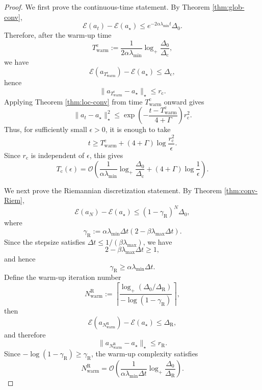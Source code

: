 \documentclass[11pt]{article}
\theoremstyle{plain}
\theoremstyle{definition}
\theoremstyle{remark}
\begin{document}
\begin{proof}
    We first prove the continuous-time statement. By Theorem \ref{thm:glob-conv},
    \[
        \mathcal E(a_t)-\mathcal E(a_\star)
        \leq
        e^{-2\alpha\lambda_{\min}t}
        \Delta_0.
    \]
    Therefore, after the warm-up time
    \[
        T_\mathrm{warm}^\mathrm{c}
        :=
        \frac{1}{2\alpha\lambda_{\min}}
        \log_+
        \frac{\Delta_0}{\Delta_\mathrm{c}},
    \]
    we have
    \[
        \mathcal E(a_{T_\mathrm{warm}^\mathrm{c}})
        -
        \mathcal E(a_\star)
        \leq
        \Delta_\mathrm{c},
    \]
    hence
    \[
        \|a_{T_\mathrm{warm}^\mathrm{c}}-a_\star\|_\star
        \leq
        r_\mathrm{c}.
    \]
    Applying Theorem \ref{thm:loc-conv} from time $T_\mathrm{warm}^\mathrm{c}$ onward gives
    \[
        \|a_t-a_\star\|_\star^2
        \leq
        \exp\left(
            -\frac{t-T_\mathrm{warm}^\mathrm{c}}{4+\Gamma}
        \right)
        r_\mathrm{c}^2.
    \]
    Thus, for sufficiently small $\epsilon>0$, it is enough to take
    \[
        t
        \geq
        T_\mathrm{warm}^\mathrm{c}
        +
        (4+\Gamma)\log\frac{r_\mathrm{c}^2}{\epsilon}.
    \]
    Since $r_\mathrm{c}$ is independent of $\epsilon$, this gives
    \[
        T_\mathrm{c}(\epsilon)
        =
        \mathcal O\left(
            \frac{1}{\alpha\lambda_{\min}}
            \log_+
            \frac{\Delta_0}{\Delta_\mathrm{c}}
            +
            (4+\Gamma)\log\frac{1}{\epsilon}
        \right).
    \]

    We next prove the Riemannian discretization statement. By Theorem \ref{thm:conv-Riem},
    \[
        \mathcal E(a_N)-\mathcal E(a_\star)
        \leq
        (1-\gamma_\mathrm{R})^N
        \Delta_0,
    \]
    where
    \[
        \gamma_\mathrm{R}
        :=
        \alpha\lambda_{\min}\Delta t
        (2-\beta\lambda_{\max}\Delta t).
    \]
    Since the stepsize satisfies $\Delta t\leq 1/(\beta\lambda_{\max})$, we have
    \[
        2-\beta\lambda_{\max}\Delta t \geq 1,
    \]
    and hence
    \[
        \gamma_\mathrm{R}
        \geq
        \alpha\lambda_{\min}\Delta t.
    \]
    Define the warm-up iteration number
    \[
        N_\mathrm{warm}^\mathrm{R}
        :=
        \left\lceil
            \frac{
                \log_+(\Delta_0/\Delta_\mathrm{R})
            }{
                -\log(1-\gamma_\mathrm{R})
            }
        \right\rceil,
    \]
    then
    \[
        \mathcal E(a_{N_\mathrm{warm}^\mathrm{R}})
        -
        \mathcal E(a_\star)
        \leq
        \Delta_\mathrm{R},
    \]
    and therefore
    \[
        \|a_{N_\mathrm{warm}^\mathrm{R}}-a_\star\|_\star
        \leq
        r_\mathrm{R}.
    \]
    Since $-\log(1-\gamma_\mathrm{R})\geq \gamma_\mathrm{R}$, the warm-up complexity satisfies
    \[
        N_\mathrm{warm}^\mathrm{R}
        =
        \mathcal O\left(
            \frac{1}{\alpha\lambda_{\min}\Delta t}
            \log_+
            \frac{\Delta_0}{\Delta_\mathrm{R}}
        \right).
    \]


\end{proof}
\end{document}
